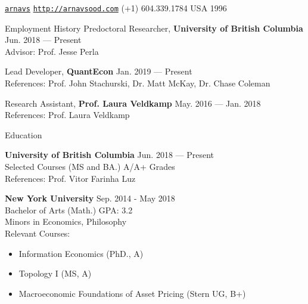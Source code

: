 \documentclass{resume} %
\begin{document}
 \href{https://github.com/arnavs}{\tt arnavs} \vline \hspace{0.5 em} {} \href{http://arnavsood.com}{\tt http://arnavsood.com} \vline \hspace{0.5 em}  (+1) 604.339.1784 \vline \hspace{0.5 em}  USA \vline \hspace{0.5 em}  1996

\begin{rSection}{Employment History}
Predoctoral Researcher, {\bf University of British Columbia} \hfill {Jun. 2018 --- Present} 
\\ Advisor: Prof. Jesse Perla \smallskip 

Lead Developer, {\bf QuantEcon} \hfill {Jan. 2019 --- Present}
\\ References: Prof. John Stachurski, Dr. Matt McKay, Dr. Chase Coleman

Research Assistant, {\bf Prof. Laura Veldkamp} \hfill {May. 2016 --- Jan. 2018}
\\ References: Prof. Laura Veldkamp 
\end{rSection}


\begin{rSection}{Education}

{\bf University of British Columbia} \hfill {Jun. 2018 --- Present} 
\\ Selected Courses (MS and BA.)  \hfill { A/A+ Grades }
\\ References: Prof. Vitor Farinha Luz

{\bf New York University} \hfill {Sep. 2014 - May 2018} 
\\ Bachelor of Arts (Math.) \hfill { GPA: 3.2 } 
\\ Minors in Economics, Philosophy 
\\ Relevant Courses: 
\begin{itemize}[noitemsep, nolistsep]
    \item Information Economics (PhD., A) 
    \item Topology I (MS, A)
    \item Macroeconomic Foundations of Asset Pricing (Stern UG, B+)
\end{itemize}

\end{rSection}
\end{document}
